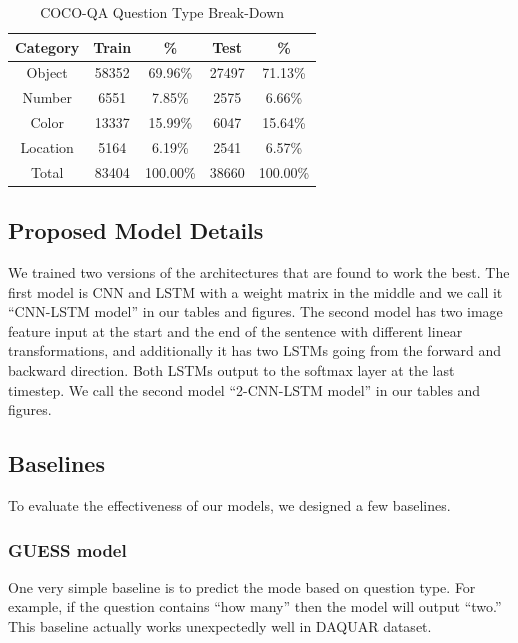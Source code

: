 \documentclass{article}
\renewcommand{\#}[1]{\textbf{#1}}
\begin{document}
\begin{table}
\label{tab:dataset_category_stats}
\caption{COCO-QA Question Type Break-Down}
\vskip 0.15in
\begin{center}
\begin{small}
\begin{sc}
\begin{tabular}{c c c c c}
\hline
\abovespace\belowspace
Category & Train & \%       & Test  & \%       \\
\hline
\abovespace
Object   & 58352 & 69.96\%  & 27497 & 71.13\%  \\
Number   & 6551  & 7.85\%   & 2575  & 6.66\%   \\
Color    & 13337 & 15.99\%  & 6047  & 15.64\%  \\
\belowspace
Location & 5164  & 6.19\%   & 2541  & 6.57\%   \\
\hline
\belowspace
\abovespace
Total    & 83404 & 100.00\% & 38660 & 100.00\% \\
\hline
\end{tabular}
\end{sc}
\end{small}
\end{center}
\end{table}

\subsection{Proposed Model Details}
We trained two versions of the architectures that are found to work the best. The first model is CNN and LSTM with a weight matrix in the middle and we call it ``CNN-LSTM model'' in our tables and figures. The second model has two image feature input at the start and the end of the sentence with different linear transformations, and additionally it has two LSTMs going from the forward and backward direction. Both LSTMs output to the softmax layer at the last timestep. We call the second model ``2-CNN-LSTM model'' in our tables and figures.

\subsection{Baselines}
To evaluate the effectiveness of our models, we designed a few baselines. 

\subsubsection{GUESS model}
One very simple baseline is to predict the mode based on question type. For example, if the question contains ``how many'' then the model will output ``two.'' This baseline actually works unexpectedly well in DAQUAR dataset.
\end{document}

